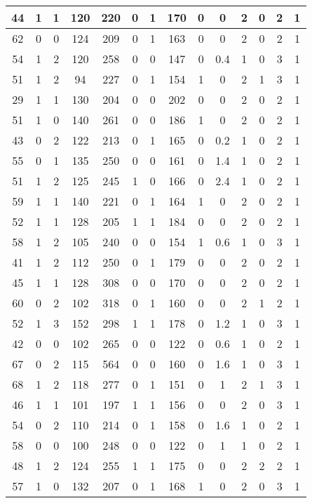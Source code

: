 \documentclass{article}
\begin{document}
\begin{longtable}{|c|c|c|c|c|c|c|c|c|c|c|c|c|c|}
44 & 1 & 1 & 120 & 220 & 0 & 1 & 170 & 0 & 0 & 2 & 0 & 2 & 1\\ \hline
62 & 0 & 0 & 124 & 209 & 0 & 1 & 163 & 0 & 0 & 2 & 0 & 2 & 1\\ \hline
54 & 1 & 2 & 120 & 258 & 0 & 0 & 147 & 0 & 0.4 & 1 & 0 & 3 & 1\\ \hline
51 & 1 & 2 & 94 & 227 & 0 & 1 & 154 & 1 & 0 & 2 & 1 & 3 & 1\\ \hline
29 & 1 & 1 & 130 & 204 & 0 & 0 & 202 & 0 & 0 & 2 & 0 & 2 & 1\\ \hline
51 & 1 & 0 & 140 & 261 & 0 & 0 & 186 & 1 & 0 & 2 & 0 & 2 & 1\\ \hline
43 & 0 & 2 & 122 & 213 & 0 & 1 & 165 & 0 & 0.2 & 1 & 0 & 2 & 1\\ \hline
55 & 0 & 1 & 135 & 250 & 0 & 0 & 161 & 0 & 1.4 & 1 & 0 & 2 & 1\\ \hline
51 & 1 & 2 & 125 & 245 & 1 & 0 & 166 & 0 & 2.4 & 1 & 0 & 2 & 1\\ \hline
59 & 1 & 1 & 140 & 221 & 0 & 1 & 164 & 1 & 0 & 2 & 0 & 2 & 1\\ \hline
52 & 1 & 1 & 128 & 205 & 1 & 1 & 184 & 0 & 0 & 2 & 0 & 2 & 1\\ \hline
58 & 1 & 2 & 105 & 240 & 0 & 0 & 154 & 1 & 0.6 & 1 & 0 & 3 & 1\\ \hline
41 & 1 & 2 & 112 & 250 & 0 & 1 & 179 & 0 & 0 & 2 & 0 & 2 & 1\\ \hline
45 & 1 & 1 & 128 & 308 & 0 & 0 & 170 & 0 & 0 & 2 & 0 & 2 & 1\\ \hline
60 & 0 & 2 & 102 & 318 & 0 & 1 & 160 & 0 & 0 & 2 & 1 & 2 & 1\\ \hline
52 & 1 & 3 & 152 & 298 & 1 & 1 & 178 & 0 & 1.2 & 1 & 0 & 3 & 1\\ \hline
42 & 0 & 0 & 102 & 265 & 0 & 0 & 122 & 0 & 0.6 & 1 & 0 & 2 & 1\\ \hline
67 & 0 & 2 & 115 & 564 & 0 & 0 & 160 & 0 & 1.6 & 1 & 0 & 3 & 1\\ \hline
68 & 1 & 2 & 118 & 277 & 0 & 1 & 151 & 0 & 1 & 2 & 1 & 3 & 1\\ \hline
46 & 1 & 1 & 101 & 197 & 1 & 1 & 156 & 0 & 0 & 2 & 0 & 3 & 1\\ \hline
54 & 0 & 2 & 110 & 214 & 0 & 1 & 158 & 0 & 1.6 & 1 & 0 & 2 & 1\\ \hline
58 & 0 & 0 & 100 & 248 & 0 & 0 & 122 & 0 & 1 & 1 & 0 & 2 & 1\\ \hline
48 & 1 & 2 & 124 & 255 & 1 & 1 & 175 & 0 & 0 & 2 & 2 & 2 & 1\\ \hline
57 & 1 & 0 & 132 & 207 & 0 & 1 & 168 & 1 & 0 & 2 & 0 & 3 & 1\\ \hline

\end{longtable}
\end{document}
